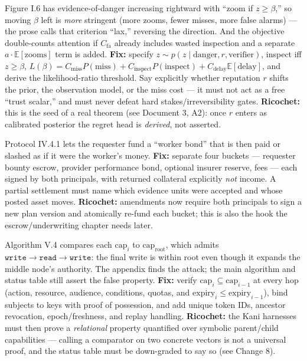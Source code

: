 \documentclass[11pt,a4paper]{article}
\begin{document}
\begin{change}
Figure I.6 has evidence-of-danger increasing rightward with ``zoom if $z\ge\beta$,'' so moving $\beta$ left is \emph{more} stringent (more zooms, fewer misses, more false alarms) --- the prose calls that criterion ``lax,'' reversing the direction. And the objective double-counts attention if $C_\text{fa}$ already includes wasted inspection and a separate $a\cdot\mathbb{E}[\text{zooms}]$ term is added. \textbf{Fix:} specify $z\sim p(z\mid \text{danger}, r, \text{verifier})$, inspect iff $z\ge\beta$, $L(\beta)=C_\text{miss}P(\text{miss})+C_\text{inspect}P(\text{inspect})+C_\text{delay}\mathbb{E}[\text{delay}]$, and derive the likelihood-ratio threshold. Say explicitly whether reputation $r$ shifts the prior, the observation model, or the miss cost --- it must not act as a free ``trust scalar,'' and must never defeat hard stakes/irreversibility gates. \textbf{Ricochet:} this is the seed of a real theorem (see Document 3, A2): once $r$ enters as calibrated posterior the regret head is \emph{derived}, not asserted.
\end{change}

\begin{change}
Protocol IV.4.1 lets the requester fund a ``worker bond'' that is then paid or slashed as if it were the worker's money. \textbf{Fix:} separate four buckets --- requester bounty escrow, provider performance bond, optional insurer reserve, fees --- each signed by both principals, with returned collateral explicitly \emph{not} income. A partial settlement must name which evidence units were accepted and whose posted asset moves. \textbf{Ricochet:} amendments now require both principals to sign a new plan version and atomically re-fund each bucket; this is also the hook the escrow/underwriting chapter needs later.
\end{change}

\begin{change}
Algorithm V.4 compares each $\mathrm{cap}_i$ to $\mathrm{cap}_\text{root}$, which admits $\texttt{write}\!\to\!\texttt{read}\!\to\!\texttt{write}$: the final write is within root even though it expands the middle node's authority. The appendix finds the attack; the main algorithm and status table still assert the false property. \textbf{Fix:} verify $\mathrm{cap}_i \subseteq \mathrm{cap}_{i-1}$ at every hop (action, resource, audience, conditions, quotas, and $\text{expiry}_i \le \text{expiry}_{i-1}$), bind subjects to keys with proof of possession, and add unique token IDs, ancestor revocation, epoch/freshness, and replay handling. \textbf{Ricochet:} the Kani harnesses must then prove a \emph{relational} property quantified over symbolic parent/child capabilities --- calling a comparator on two concrete vectors is not a universal proof, and the status table must be down-graded to say so (see Change 8).
\end{change}
\end{document}
